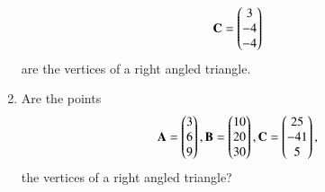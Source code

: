 \begin{enumerate}[label=\arabic*.,ref=\thesubsection.\theenumi]
\begin{align}
\mathbf{C} = \begin{pmatrix}3\\ -4\\-4\end{pmatrix}
\end{align}
%
are the vertices of a right angled triangle.
\item Are the points 
\begin{align}
\mathbf{A} = \begin{pmatrix}3\\6 \\9\end{pmatrix},
\mathbf{B} = \begin{pmatrix}10\\20 \\30\end{pmatrix},
\mathbf{C} = \begin{pmatrix}25\\ -41\\5\end{pmatrix},
\end{align}
%
the vertices of a right angled triangle?
\end{enumerate}
%
